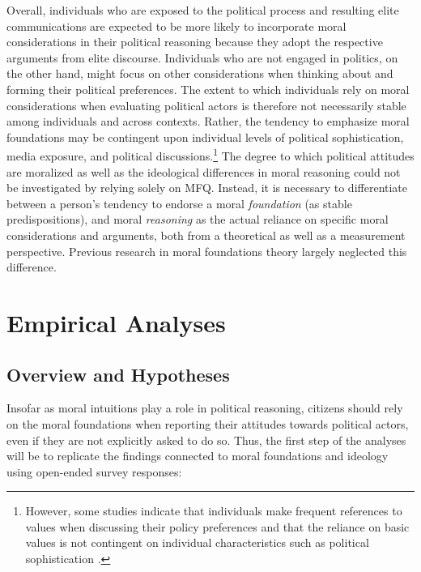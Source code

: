\documentclass[12pt]{article}
\begin{document}
Overall, individuals who are exposed to the political process and resulting elite communications are expected to be more likely to incorporate moral considerations in their political reasoning because they adopt the respective arguments from elite discourse. Individuals who are not engaged in politics, on the other hand, might focus on other considerations when thinking about and forming their political preferences. The extent to which individuals rely on moral considerations when evaluating political actors is therefore not necessarily stable among individuals and across contexts. Rather, the tendency to emphasize moral foundations may be contingent upon individual levels of political sophistication, media exposure, and political discussions.\footnote{However, some studies indicate that individuals make frequent references to values when discussing their policy preferences \citep{feldman1992political} and that the reliance on basic values is not contingent on individual characteristics such as political sophistication \citep[e.g.][]{goren2001core,goren2004political,marietta2007values}.} The degree to which political attitudes are moralized as well as the ideological differences in moral reasoning could not be investigated by relying solely on MFQ. Instead, it is necessary to differentiate between a person's tendency to endorse a moral \textit{foundation} (as stable predispositions), and moral \textit{reasoning} as the actual reliance on specific moral considerations and arguments, both from a theoretical as well as a measurement perspective. Previous research in moral foundations theory largely neglected this difference.



\section{Empirical Analyses}

\subsection{Overview and Hypotheses}

Insofar as moral intuitions play a role in political reasoning, citizens should rely on the moral foundations when reporting their attitudes towards political actors, even if they are not explicitly asked to do so. Thus, the first step of the analyses will be to replicate the findings connected to moral foundations and ideology using open-ended survey responses:
\end{document}
